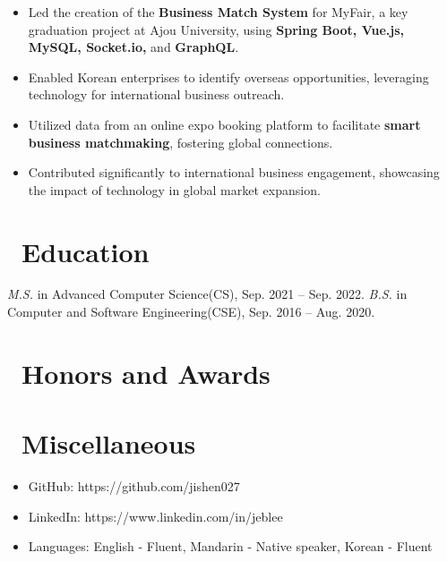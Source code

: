 \documentclass{resume}
\begin{document}
\begin{itemize}
  \item Led the creation of the \textbf{Business Match System} for MyFair, a key graduation project at Ajou University, using \textbf{Spring Boot, Vue.js, MySQL, Socket.io,} and \textbf{GraphQL}.
  \item Enabled Korean enterprises to identify overseas opportunities, leveraging technology for international business outreach.
  \item Utilized data from an online expo booking platform to facilitate \textbf{smart business matchmaking}, fostering global connections.
  \item Contributed significantly to international business engagement, showcasing the impact of technology in global market expansion.
\end{itemize}


\section{\faGraduationCap\ Education}
\textit{M.S.} in Advanced Computer Science(CS), Sep. 2021 -- Sep. 2022.
\textit{B.S.} in Computer and Software Engineering(CSE), Sep. 2016 -- Aug. 2020.

\section{\faHeartO\ Honors and Awards}

\section{\faInfo\ Miscellaneous}
\begin{itemize}[parsep=0.5ex]
  \item GitHub: https://github.com/jishen027
  \item LinkedIn: https://www.linkedin.com/in/jeblee
  \item Languages: English - Fluent, Mandarin - Native speaker, Korean - Fluent
\end{itemize}

%
%
\end{document}
